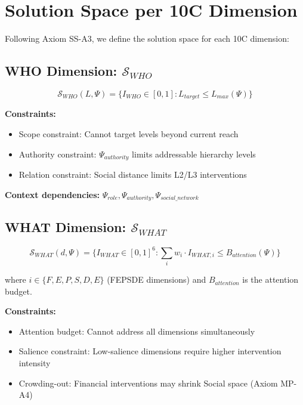 \section{Solution Space per 10C Dimension}
\label{sec:ss-per-10c}

Following Axiom SS-A3, we define the solution space for each 10C dimension:

\subsection{WHO Dimension: $\mathcal{S}_{WHO}$}

\begin{equation}
\mathcal{S}_{WHO}(L, \Psi) = \{I_{WHO} \in [0,1] : L_{target} \leq L_{max}(\Psi)\}
\end{equation}

\textbf{Constraints:}
\begin{itemize}
    \item Scope constraint: Cannot target levels beyond current reach
    \item Authority constraint: $\Psi_{authority}$ limits addressable hierarchy levels
    \item Relation constraint: Social distance limits L2/L3 interventions
\end{itemize}

\textbf{Context dependencies:} $\Psi_{role}, \Psi_{authority}, \Psi_{social\_network}$

\subsection{WHAT Dimension: $\mathcal{S}_{WHAT}$}

\begin{equation}
\mathcal{S}_{WHAT}(d, \Psi) = \{I_{WHAT} \in [0,1]^6 : \sum_i w_i \cdot I_{WHAT,i} \leq B_{attention}(\Psi)\}
\end{equation}

where $i \in \{F, E, P, S, D, E\}$ (FEPSDE dimensions) and $B_{attention}$ is the attention budget.

\textbf{Constraints:}
\begin{itemize}
    \item Attention budget: Cannot address all dimensions simultaneously
    \item Salience constraint: Low-salience dimensions require higher intervention intensity
    \item Crowding-out: Financial interventions may shrink Social space (Axiom MP-A4)
\end{itemize}

